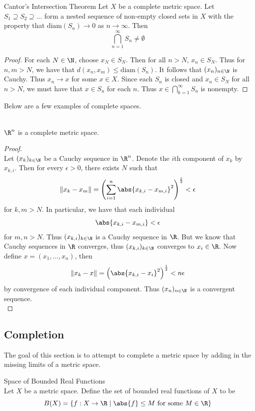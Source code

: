 \documentclass[a4paper]{article}
\begin{document}
\begin{thm}{Cantor's Intersection Theorem}{} Let $X$ be a complete metric space. Let $S_1\supseteq S_2\supseteq\dots$ form a nested sequence of non-empty closed sets in $X$ with the property that $\text{diam}(S_n)\to 0$ as $n\to\infty$. Then $$\bigcap_{n=1}^\infty S_n\neq\emptyset$$ 
\begin{proof}
For each $N\in\N$, choose $x_N\in S_N$. Then for all $n>N$, $x_n\in S_N$. Thus for $n,m>N$, we have that $d(x_n,x_m)\leq\text{diam}(S_n)$. It follows that $(x_n)_{n\in\N}$ is Cauchy. Thus $x_n\to x$ for some $x\in X$. Since each $S_n$ is closed and $x_n\in S_N$ for all $n>N$, we must have that $x\in S_n$ for each $n$. Thus $x\in\bigcap_{k=1}^\infty S_n$ is nonempty. 
\end{proof}
\end{thm}

Below are a few examples of complete spaces. 

\begin{eg}{}{}\\
$\R^n$ is a complete metric space. 
\begin{proof}\\
Let $(x_k)_{k\in\N}$ be a Cauchy sequence in $\R^n$. Denote the $i$th component of $x_k$ by $x_{k,i}$. Then for every $\epsilon>0$, there exists $N$ such that $$\|x_k-x_m\|=\left(\sum_{i=1}^n\abs{x_{k,i}-x_{m,i}}^2\right)^{\frac{1}{2}}<\epsilon$$ for $k,m>N$. In particular, we have that each individual $$\abs{x_{k,i}-x_{m,i}}<\epsilon$$ for $m,n>N$. Thus $(x_{k,i})_{k\in\N}$ is a Cauchy sequence in $\R$. But we know that Cauchy sequences in $\R$ converges, thus $(x_{k,i})_{k\in\N}$ converges to $x_i\in\R$. Now define $x=(x_1,\dots,x_n)$, then $$\|x_k-x\|=\left(\abs{x_{k,i}-x_i}^2\right)^{\frac{1}{2}}<n\epsilon$$ by convergence of each individual component. Thus $(x_n)_{n\in\N}$ is a convergent sequence. \\
\end{proof}
\end{eg}

\subsection{Completion}
The goal of this section is to attempt to complete a metric space by adding in the missing limits of a metric space. 

\begin{defn}{Space of Bounded Real Functions}{}\\
Let $X$ be a metric space. Define the set of bounded real functions of $X$ to be $$B(X)=\{f:X\to\R\;|\;\abs{f}\leq M\text{ for some }M\in\R\}$$
\end{defn}
\end{document}
